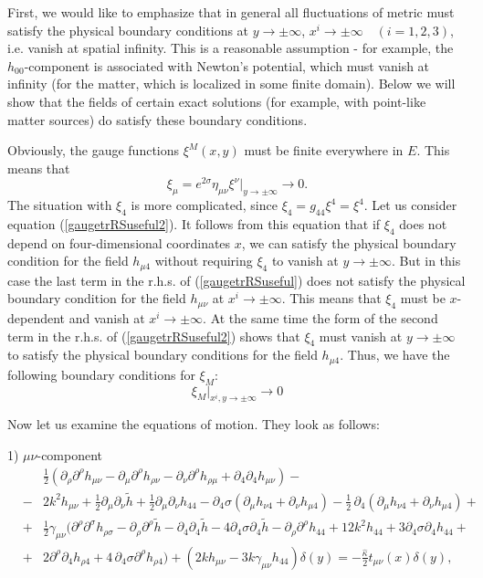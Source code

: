 \documentclass[a4paper,12pt]{article}
\begin{document}
First, we would like to emphasize that in general all fluctuations of
metric must satisfy the physical boundary conditions at  $y\to\pm\infty$,
$ x^i\to\pm\infty \quad (i=1,2,3)$, i.e. vanish at spatial infinity. This
is a reasonable assumption - for example, the $h_{00}$-component is
associated with  Newton's potential, which must vanish at infinity (for the
matter, which is localized in some finite domain). Below we will show that
the fields of certain exact solutions (for example, with point-like matter
sources) do satisfy these boundary conditions.

Obviously, the gauge functions  $\xi^M(x,y)$ must be finite everywhere in
$E$. This means that $$
\xi_{\mu}=e^{2\sigma}\eta_{\mu\nu}\xi^{\nu}|_{y\to\pm\infty} \to 0. $$ The
situation with $\xi_4$ is more complicated, since
$\xi_4=g_{44}\xi^4=\xi^4$. Let us consider equation
(\ref{gaugetrRSuseful2}). It follows from this equation  that if $\xi_4$
does not depend on four-dimensional coordinates $x$, we can satisfy the
physical boundary condition for the field $h_{\mu 4}$ without requiring
$\xi_4$ to vanish at $y\to\pm\infty$. But in this case the last term in the
r.h.s. of (\ref{gaugetrRSuseful}) does not satisfy the physical boundary
condition for the field $h_{\mu\nu}$ at $ x^i\to\pm\infty$. This means that
$\xi_4$ must be $x$-dependent and vanish at $ x^i\to\pm\infty$. At the same
time the form of the second term in the r.h.s. of (\ref{gaugetrRSuseful2})
shows that $\xi_4$ must vanish at $y\to\pm\infty$ to satisfy the physical
boundary conditions for the field $h_{\mu 4}$. Thus, we have the following
boundary conditions for $\xi_M$:
\begin{equation}
\xi_M|_{ x^i,y\to\pm\infty}\to 0
\end{equation}

Now let us examine the equations of motion. They look as follows:

1) $\mu\nu$-component
\begin{eqnarray}\label{mu-nu}
 & &\frac{1}{2}\left(\partial_\rho \partial^\rho h_{\mu\nu}-
\partial_\mu \partial^\rho
h_{\rho\nu}-\partial_\nu \partial^\rho h_{\rho\mu} +
\partial_4\partial_4 h_{\mu\nu}\right)- \\
\nonumber &-& 2k^2h_{\mu\nu}+\frac{1}{2}\partial_\mu
\partial_\nu\tilde h+ \frac{1}{2}\partial_\mu \partial_\nu
h_{44}-\partial_4\sigma(\partial_{\mu}h_{\nu
4}+\partial_{\nu}h_{\mu 4})
-\frac{1}{2}\,\partial_4(\partial_{\mu}h_{\nu
4}+\partial_{\nu}h_{\mu 4})+
\\ \nonumber &+& \frac{1}{2} \gamma_{\mu\nu}\Biggl(\partial^\rho
\partial^\sigma h_{\rho\sigma}-\partial_\rho \partial^\rho \tilde
h - \partial_4\partial_4 \tilde h -4\partial_4\sigma
\partial_4 \tilde h - \partial_\rho \partial^\rho h_{44} + 12 k^2 h_{44}
+ 3\partial_4\sigma\partial_4 h_{44}+ \\ \nonumber &+&
2\partial^{\rho}\partial_4 h_{\rho
4}+4\,\partial_4\sigma\partial^{\rho}h_{\rho 4} \Biggr)
 +\left(2k  h_{\mu\nu} - 3k\gamma_{\mu\nu}h_{44}
\right)\delta(y) = -\frac{\hat \kappa}{2} t_{\mu\nu}(x)\delta(y),
\end{eqnarray}
\end{document}
